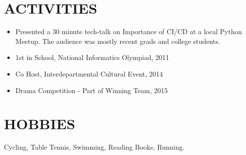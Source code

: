 \documentclass[margin]{res}
\begin{document}
\begin{resume}
\section{ACTIVITIES}
 \begin{itemize}
 \item Presented a 30 minute tech-talk on Importance of CI/CD at a local Python Meetup. The audience was mostly recent grads and college students.
 \end{itemize}
 \begin{itemize}
 \item 1st in School, National Informatics Olympiad, 2011
 \end{itemize}
  \begin{itemize}
 \item Co Host, Interdepartmental Cultural Event, 2014
 \end{itemize}
  \begin{itemize}
 \item Drama Competition - Part of Winning Team, 2015
 \end{itemize}
 
\section{HOBBIES}         Cycling, Table Tennis, Swimming, Reading Books, Running.
 
\end{resume} 
\end{document}
